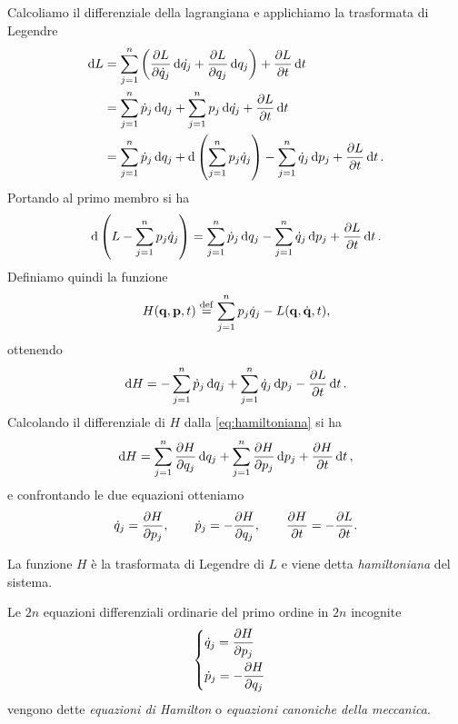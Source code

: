 Calcoliamo il differenziale della lagrangiana e applichiamo la trasformata di Legendre
\begin{align*}
    \dd{L} &= \sum_{j=1}^n \left( \pdv{L}{\dot{q}_j} \dd{\dot{q_j}} + \pdv{L}{q_j} \dd{q_j} \right) + \pdv{L}{t} \dd{t} \\
    &= \sum_{j=1}^n \dot{p}_j \dd{q_j} +  \sum_{j=1}^n p_j \dd{\dot{q_j}} + \pdv{L}{t} \dd{t} \\
    &= \sum_{j=1}^n \dot{p}_j \dd{q_j} +  \dd {\left(\sum_{j=1}^n p_j \dot{q}_j\right)} - \sum_{j=1}^n \dot{q}_j \dd{p_j} + \pdv{L}{t} \dd{t}.
\end{align*}
Portando al primo membro si ha
\begin{equation*}
    \dd \left(L - \sum_{j=1}^n p_j\dot{q}_j \right) = \sum_{j=1}^n \dot{p}_j \dd{q_j} - \sum_{j=1}^n \dot{q}_j \dd{p_j} + \pdv{L}{t} \dd{t}.
\end{equation*}
Definiamo quindi la funzione
\begin{equation} \label{eq:hamiltoniana}
    H(\vb{q}, \vb{p}, t) \overset{\mathrm{def}}{=} \sum_{j=1}^n p_j\dot{q}_j - L(\vb{q}, \dot{\vb{q}}, t),
\end{equation}
ottenendo
\begin{equation*}
    \dd{H} = -\sum_{j=1}^n \dot{p}_j \dd{q_j} + \sum_{j=1}^n \dot{q}_j \dd{p_j} - \pdv{L}{t} \dd{t}.
\end{equation*}
Calcolando il differenziale di $H$ dalla \eqref{eq:hamiltoniana} si ha
\begin{equation*}
    \dd{H} = \sum_{j=1}^n \pdv{H}{q_j} \dd{q_j} + \sum_{j=1}^n \pdv{H}{p_j} \dd{p_j} + \pdv{H}{t} \dd{t},
\end{equation*}
e confrontando le due equazioni otteniamo
\begin{equation*}
 \dot{q}_j = \pdv{H}{p_j}, \qquad \dot{p}_j = -\pdv{H}{q_j}, \qquad \pdv{H}{t} = -\pdv{L}{t}.
\end{equation*}

La funzione $H$ è la trasformata di Legendre di $L$ e viene detta \emph{hamiltoniana} del sistema.

Le $2n$ equazioni differenziali ordinarie del primo ordine in $2n$ incognite
\begin{equation*}
    \begin{cases}
        \displaystyle \dot{q}_j = \pdv{H}{p_j} \\[0.3cm]
        \displaystyle \dot{p}_j = -\pdv{H}{q_j}
    \end{cases}
\end{equation*}
vengono dette \emph{equazioni di Hamilton} o \emph{equazioni canoniche della meccanica}.

